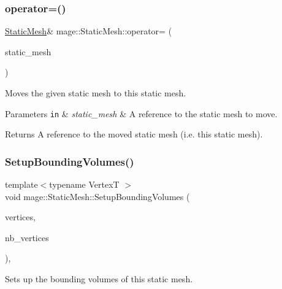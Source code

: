 \subsubsection{\texorpdfstring{operator=()}{operator=()}\hspace{0.1cm}{\footnotesize\ttfamily [2/2]}}
{\footnotesize\ttfamily \hyperlink{classmage_1_1_static_mesh}{Static\+Mesh}\& mage\+::\+Static\+Mesh\+::operator= (\begin{DoxyParamCaption}\item[{\hyperlink{classmage_1_1_static_mesh}{Static\+Mesh} \&\&}]{static\+\_\+mesh }\end{DoxyParamCaption})\hspace{0.3cm}{\ttfamily [delete]}}

Moves the given static mesh to this static mesh.


\begin{DoxyParams}[1]{Parameters}
\mbox{\tt in}  & {\em static\+\_\+mesh} & A reference to the static mesh to move. \\
\hline
\end{DoxyParams}
\begin{DoxyReturn}{Returns}
A reference to the moved static mesh (i.\+e. this static mesh). 
\end{DoxyReturn}
\hypertarget{classmage_1_1_static_mesh_a532dcf96ac9b1bf7988a0726d1eb2fe5}{}\label{classmage_1_1_static_mesh_a532dcf96ac9b1bf7988a0726d1eb2fe5} 
\subsubsection{\texorpdfstring{Setup\+Bounding\+Volumes()}{SetupBoundingVolumes()}}
{\footnotesize\ttfamily template$<$typename VertexT $>$ \\
void mage\+::\+Static\+Mesh\+::\+Setup\+Bounding\+Volumes (\begin{DoxyParamCaption}\item[{const VertexT $\ast$}]{vertices,  }\item[{size\+\_\+t}]{nb\+\_\+vertices }\end{DoxyParamCaption})\hspace{0.3cm}{\ttfamily [private]}, {\ttfamily [noexcept]}}

Sets up the bounding volumes of this static mesh.

